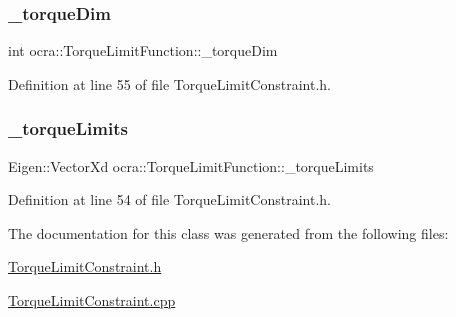\subsubsection{\texorpdfstring{\+\_\+torque\+Dim}{\_torqueDim}}
{\footnotesize\ttfamily int ocra\+::\+Torque\+Limit\+Function\+::\+\_\+torque\+Dim\hspace{0.3cm}{\ttfamily [protected]}}



Definition at line 55 of file Torque\+Limit\+Constraint.\+h.

\hypertarget{classocra_1_1TorqueLimitFunction_a929154bb1273971f123d12ce810fd375}{}\label{classocra_1_1TorqueLimitFunction_a929154bb1273971f123d12ce810fd375} 
\subsubsection{\texorpdfstring{\+\_\+torque\+Limits}{\_torqueLimits}}
{\footnotesize\ttfamily Eigen\+::\+Vector\+Xd ocra\+::\+Torque\+Limit\+Function\+::\+\_\+torque\+Limits\hspace{0.3cm}{\ttfamily [protected]}}



Definition at line 54 of file Torque\+Limit\+Constraint.\+h.



The documentation for this class was generated from the following files\+:\begin{DoxyCompactItemize}
\item 
\hyperlink{TorqueLimitConstraint_8h}{Torque\+Limit\+Constraint.\+h}\item 
\hyperlink{TorqueLimitConstraint_8cpp}{Torque\+Limit\+Constraint.\+cpp}\end{DoxyCompactItemize}
